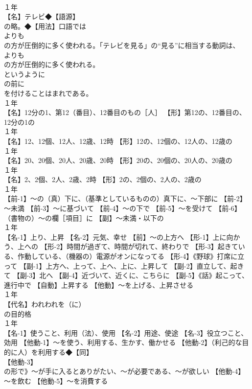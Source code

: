 \documentclass[8pt]{extreport}
\begin{document}
\begin{CJK}{UTF8}{min}
\\	１年	
\\	【名】テレビ◆【語源】
\\	の略。◆【用法】口語では
\\	よりも
\\	の方が圧倒的に多く使われる。「テレビを見る」の“見る”に相当する動詞は、
\\	よりも 
\\	の方が圧倒的に多く使われる。
\\	というように 
\\	の前に 
\\	を付けることはまれである。
\\	１年	
\\	【名】12分の1、第12（番目）、12番目のもの［人］ 【形】第12の、12番目の、12分の1の
\\	１年	
\\	【名】12、12個、12人、12歳、12時 【形】12の、12個の、12人の、12歳の
\\	１年	
\\	【名】20、20個、20人、20歳、20時 【形】20の、20個の、20人の、20歳の
\\	１年	
\\	【名】2、2個、2人、2歳、2時 【形】2の、2個の、2人の、2歳の
\\	１年	
\\	【前-1】～の（真）下に、（基準としているものの）真下に、～下部に 【前-2】～未満 【前-3】～に基づいて 【前-4】～の下で 【前-5】～を受けて 【前-6】（書物の）～の欄［項目］に 【副】～未満・以下の
\\	１年	
\\	【名-1】上り、上昇 【名-2】元気、幸せ 【前】～の上方へ 【形-1】上に向かう、上への 【形-2】時間が過ぎて、時間が切れて、終わりで 【形-3】起きている、作動している、（機器の）電源がオンになってる 【形-4】《野球》打席に立って 【副-1】上方へ、上って、上へ、上に、上昇して 【副-2】直立して、起きて 【副-3】北へ 【副-4】近づいて、近くに、こちらに 【副-5】《話》起こって、進行中で 【自動】上昇する 【他動】～を上げる、上昇させる
\\	１年	
\\	【代名】われわれを（に）
\\	の目的格
\\	１年	
\\	【名-1】使うこと、利用（法）、使用 【名-2】用途、使途 【名-3】役立つこと、効用 【他動-1】～を使う、利用する、生かす、働かせる 【他動-2】（利己的な目的に人）を利用する◆【同】
\\	【他動-3】
\\	の形で》～が手に入るとありがたい、～が必要である、～が欲しい 【他動-4】～を飲む 【他動-5】～を消費する

\end{CJK}
\end{document}
